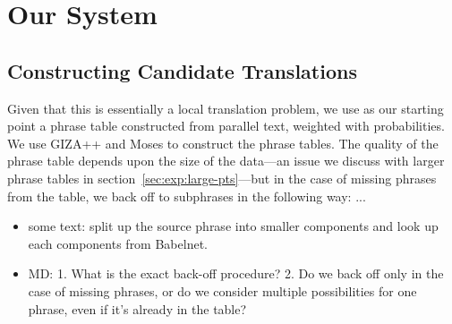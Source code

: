 \documentclass[11pt]{article}
\begin{document}

\section{Our  System}
\label{sec:system}

\subsection{Constructing Candidate Translations}
\label{sec:candidates}

Given that this is essentially a local translation problem, we use as our starting point a phrase table constructed from parallel text, weighted with probabilities.  We use GIZA++ \cite{och:ney:00} and Moses \cite{koehn:hoang:ea:07} to construct the phrase tables.  The quality of the phrase table depends upon the size of the data---an issue we discuss with larger phrase tables in section~\ref{sec:exp:large-pts}---but in the case of missing phrases from the table, we back off to subphrases in the following way: ...

\begin{itemize}
\item some text: split up the source phrase into smaller components
  and look up each components from Babelnet.
\item MD: 1. What is the exact back-off procedure? 2. Do we back off
  only in the case of missing phrases, or do we consider multiple
  possibilities for one phrase, even if it’s already in the table?
\end{itemize}

\end{document}
